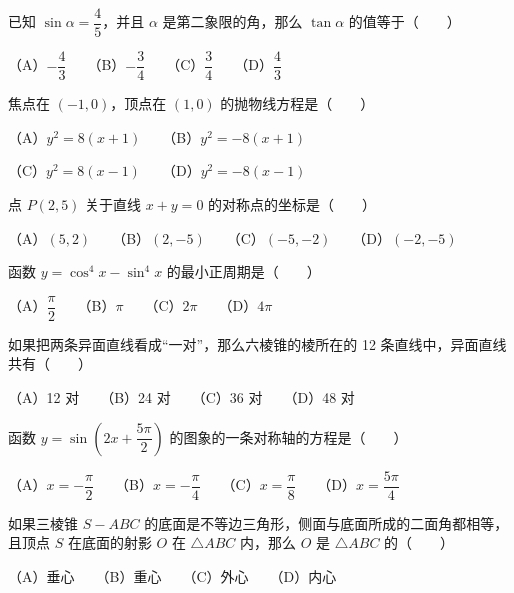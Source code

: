 \begin{question}

已知 $\sin\alpha=\dfrac45$，并且 $\alpha$ 是第二象限的角，那么 $\tan\alpha$ 的值等于\mbox{（　　）}

（A）$-\dfrac43$　　（B）$-\dfrac34$　　（C）$\dfrac34$　　（D）$\dfrac43$

\end{question}
\begin{question}

焦点在 $(-1,0)$，顶点在 $(1,0)$ 的抛物线方程是\mbox{（　　）}

（A）$y^2=8(x+1)$　　（B）$y^2=-8(x+1)$

（C）$y^2=8(x-1)$　　（D）$y^2=-8(x-1)$

\end{question}
\begin{question}

点 $P(2,5)$ 关于直线 $x+y=0$ 的对称点的坐标是\mbox{（　　）}

（A）$(5,2)$　　（B）$(2,-5)$　　（C）$(-5,-2)$　　（D）$(-2,-5)$

\end{question}
\begin{question}

函数 $y=\cos^4x-\sin^4x$ 的最小正周期是\mbox{（　　）}

（A）$\dfrac\pi2$　　（B）$\pi$　　（C）$2\pi$　　（D）$4\pi$

\end{question}
\begin{question}

如果把两条异面直线看成“一对”，那么六棱锥的棱所在的 12 条直线中，异面直线共有\mbox{（　　）}

（A）12 对　　（B）24 对　　（C）36 对　　（D）48 对

\end{question}
\begin{question}

函数 $y=\sin\left(2x+\dfrac{5\pi}{2}\right)$ 的图象的一条对称轴的方程是\mbox{（　　）}

（A）$x=-\dfrac\pi2$　　（B）$x=-\dfrac\pi4$　　（C）$x=\dfrac\pi8$　　（D）$x=\dfrac{5\pi}4$

\end{question}
\begin{question}

如果三棱锥 $S-ABC$ 的底面是不等边三角形，侧面与底面所成的二面角都相等，且顶点 $S$ 在底面的射影 $O$ 在 $\triangle ABC$ 内，那么 $O$ 是 $\triangle ABC$ 的\mbox{（　　）}

（A）垂心　　（B）重心　　（C）外心　　（D）内心

\end{question}
